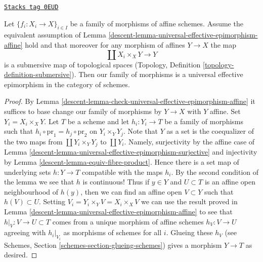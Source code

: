 \begin{lemma}
\label{descent-lemma-universal-effective-epimorphism}
\href{https://stacks.math.columbia.edu/tag/0EUD}{\texttt{Stacks tag 0EUD}}

Let $\{f_i : X_i \to X\}_{i \in I}$ be a family of morphisms of affine
schemes. Assume the equivalent assumption of
Lemma \ref{descent-lemma-universal-effective-epimorphism-affine} hold
and that moreover for any morphism of affines $Y \to X$ the map
$$
\coprod X_i \times_X Y \longrightarrow Y
$$
is a submersive map of topological spaces
(Topology, Definition \ref{topology-definition-submersive}).
Then our family of morphisms is a universal effective epimorphism
in the category of schemes.
\end{lemma}

\begin{proof}

By Lemma \ref{descent-lemma-check-universal-effective-epimorphism-affine}
it suffices to base change our family of morphisms
by $Y \to X$ with $Y$ affine. Set $Y_i = X_i \times_X Y$.
Let $T$ be a scheme and let $h_i : Y_i \to T$ be a family of morphisms
such that $h_i \circ \text{pr}_1 = h_j \circ \text{pr}_2$
on $Y_i \times_Y Y_j$. Note that $Y$ as a set is the coequalizer
of the two maps from $\coprod Y_i \times_Y Y_j$ to $\coprod Y_i$.
Namely, surjectivity by the affine case of
Lemma \ref{descent-lemma-universal-effective-epimorphism-surjective}
and injectivity by Lemma \ref{descent-lemma-equiv-fibre-product}.
Hence there is a set map of underlying sets $h : Y \to T$
compatible with the maps $h_i$. By the second condition of
the lemma we see that $h$ is continuous!
Thus if $y \in Y$ and $U \subset T$ is an affine open
neighbourhood of $h(y)$, then we can find an affine open
$V \subset Y$ such that $h(V) \subset U$.
Setting $V_i = Y_i \times_Y V = X_i \times_X V$
we can use the result proved in
Lemma \ref{descent-lemma-universal-effective-epimorphism-affine}
to see that $h|_V : V \to U \subset T$ comes from a unique
morphism of affine schemes $h_V : V \to U$ agreeing with $h_i|_{V_i}$
as morphisms of schemes for all $i$. Glueing these $h_V$
(see Schemes, Section \ref{schemes-section-glueing-schemes})
gives a morphism $Y \to T$ as desired.
\end{proof}

